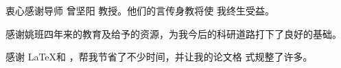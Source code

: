 \begin{acknowledgement}
  衷心感谢导师 曾坚阳 教授。他们的言传身教将使
  我终生受益。
  
  感谢姚班四年来的教育及给予的资源，为我今后的科研道路打下了良好的基础。

  感谢 \LaTeX 和 \thuthesis，帮我节省了不少时间，并让我的论⽂格
  式规整了许多。
\end{acknowledgement}
